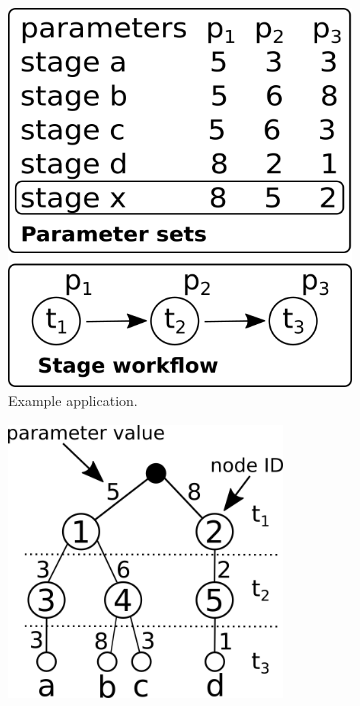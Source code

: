 \begin{figure}[h]
	 \centering
	 \begin{subfigure}[b]{0.3\textwidth}
			\centering
			 \includegraphics[width=\textwidth]{img/gen1-v2.png}
			 \caption{Example application.}
			 \label{fig:gen1}
	 \end{subfigure}
	 \hspace{3mm}
	 \begin{subfigure}[b]{0.3\textwidth}
			 \centering
			 \includegraphics[width=0.8\textwidth]{img/gen2.png}

\end{subfigure}
\end{figure}
